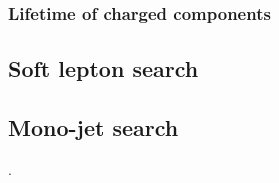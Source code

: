 \documentclass[12pt,twoside,book]{article}
\begin{document}
\subsubsection*{Lifetime of charged components}






\subsection{Soft lepton search}
\label{sec:disappearing_track}



\subsection{Mono-jet search}
\label{sec:disappearing_track}

 \cite{Baer:2014cua}.




\end{document}
